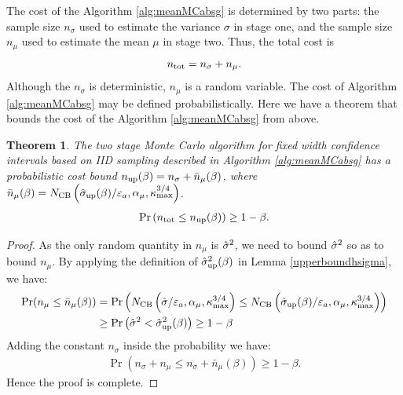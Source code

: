 \documentclass{iitthesis}
\newtheorem{theorem}{Theorem}[section]
\theoremstyle{definition}
\begin{document}
\label{sec:meanMCabsgcost}

The cost of the Algorithm \ref{alg:meanMCabsg} is determined by two parts: the sample size $n_{\sigma}$ used to estimate the variance $\sigma$ in stage one, and the sample size $n_\mu$ used to estimate the mean $\mu$ in stage two. Thus, the total cost is 
$$n_{\operatorname{tot}} = n_\sigma+n_\mu.$$
Although the $n_\sigma$ is deterministic, $n_\mu$ is a random variable. The cost of Algorithm \ref{alg:meanMCabsg} may be defined probabilistically. Here we have a theorem that bounds the cost of the Algorithm \ref{alg:meanMCabsg} from above.

\begin{theorem}
The two stage Monte Carlo algorithm for fixed width confidence intervals based on IID sampling described in Algorithm \ref{alg:meanMCabsg} has a probabilistic cost bound $n_{\operatorname{up}}(\beta) =n_\sigma+\bar{n}_{\mu}(\beta)$, where $\bar{n}_{\mu}(\beta)=N_{\text{CB}}\left(\hat{\sigma}_{\operatorname{up}}(\beta)/\varepsilon_a,\alpha_\mu, \kappa_{\max}^{3/4}\right)$.
\begin{align}
\Pr \left(n_{\operatorname{tot}} \leq n_{\operatorname{up}}(\beta)\right)  \geq 1-\beta.
\end{align}
\end{theorem}

\begin{proof}
As the only random quantity in $n_\mu$ is $\hat{\sigma}^2$, we need to bound $\hat{\sigma}^2$ so as to bound $n_{\mu}$.
 By applying the definition of $\hat{\sigma}_{\operatorname{up}}^2(\beta)$ in Lemma \ref{upperboundhsigma}, we have:
\begin{align*}
\Pr(n_{\mu} \leq \bar{n}_{\mu}(\beta))  &= \Pr\left (N_{\text{CB}}\left(\hat{\sigma}/\varepsilon_a,\alpha_\mu, \kappa_{\max}^{3/4}\right) \leq N_{\text{CB}}\left(\hat{\sigma}_{\operatorname{up}}(\beta)/\varepsilon_a,\alpha_\mu, \kappa_{\max}^{3/4}\right) \right)\\&
 \geq \Pr \left(\hat{\sigma}^2 < \hat{\sigma}_{\operatorname{up}}^2(\beta) \right) \geq 1-\beta
\end{align*}
Adding the constant $n_\sigma$ inside the probability we have:
\begin{align*}
 \Pr(n_\sigma+n_{\mu} \leq n_\sigma+\bar{n}_{\mu}(\beta))   \geq 1-\beta.
\end{align*}
Hence the proof is complete.
\end{proof}
\label{sec:numericalintegrationviaMC}
\end{document}
